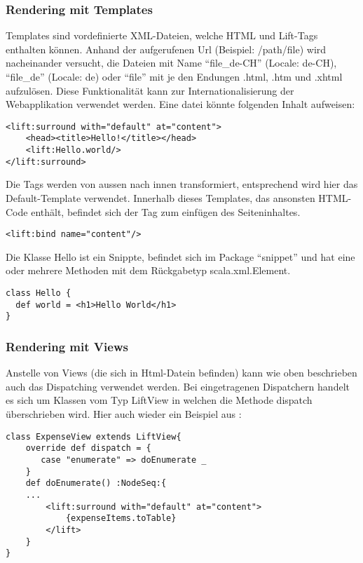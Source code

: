 \subsubsection{Rendering mit Templates} \label{grundlagen:templates}
Templates sind vordefinierte XML-Dateien, welche HTML und Lift-Tags enthalten k\"onnen. Anhand der aufgerufenen Url (Beispiel: /path/file) wird nacheinander versucht, die Dateien mit Name ``file\_de-CH'' (Locale: de-CH), ``file\_de'' (Locale: de) oder ``file'' mit je den Endungen .html, .htm und .xhtml aufzul\"osen. Diese Funktionalit\"at kann zur Internationalisierung der Webapplikation verwendet werden. Eine datei k\"onnte folgenden Inhalt aufweisen:

\begin{lstlisting}[caption=Lift Template Surround]
<lift:surround with="default" at="content">
	<head><title>Hello!</title></head>
	<lift:Hello.world/>
</lift:surround>
\end{lstlisting}

Die Tags werden von aussen nach innen transformiert, entsprechend wird hier das Default-Template verwendet. Innerhalb dieses Templates, das ansonsten HTML-Code enth\"alt, befindet sich der Tag zum einf\"ugen des Seiteninhaltes. 
\begin{lstlisting}[caption=Lift Template Binding]
<lift:bind name="content"/>
\end{lstlisting}
Die Klasse Hello ist ein Snippte, befindet sich im Package ``snippet'' und hat eine oder mehrere Methoden mit dem R\"uckgabetyp scala.xml.Element.

\begin{lstlisting}[caption=Snippet]
class Hello {
  def world = <h1>Hello World</h1>
}
\end{lstlisting}


\subsubsection{Rendering mit Views}
Anstelle von Views (die sich in Html-Datein befinden) kann wie oben beschrieben auch das Dispatching verwendet werden. Bei eingetragenen Dispatchern handelt es sich um Klassen vom Typ LiftView in welchen die Methode dispatch \"uberschrieben wird. Hier auch wieder ein Beispiel aus \cite{chen2009lift}: 

\begin{lstlisting}[caption=Views]
class ExpenseView extends LiftView{
    override def dispatch = { 
       case "enumerate" => doEnumerate _
    }
    def doEnumerate() :NodeSeq:{
 	...
        <lift:surround with="default" at="content">
            {expenseItems.toTable}
        </lift>
    }	
}
\end{lstlisting}
 
